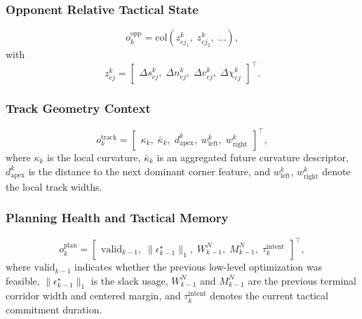\documentclass[final ,3p, times]{elsarticle}
\begin{document}
\subsubsection{Opponent Relative Tactical State}

\begin{equation}
o_k^{\mathrm{opp}}
=
\mathrm{col}
\left(
z_{ej_1}^k,\;
z_{ej_2}^k,\;
\dots
\right),
\label{eq:opponent_observation}
\end{equation}
with
\begin{equation}
z_{ej}^k=
\begin{bmatrix}
\Delta s_{ej}^k,\;
\Delta n_{ej}^k,\;
\Delta v_{ej}^k,\;
\Delta \chi_{ej}^k
\end{bmatrix}^{\!\top}.
\label{eq:relative_obs_repeat}
\end{equation}

\subsubsection{Track Geometry Context}

\begin{equation}
o_k^{\mathrm{track}}
=
\begin{bmatrix}
\kappa_k,\;
\bar\kappa_k,\;
d_{\mathrm{apex}}^k,\;
w_{\mathrm{left}}^k,\;
w_{\mathrm{right}}^k
\end{bmatrix}^{\!\top},
\label{eq:track_observation}
\end{equation}
where $\kappa_k$ is the local curvature, $\bar\kappa_k$ is an aggregated future curvature descriptor, $d_{\mathrm{apex}}^k$ is the distance to the next dominant corner feature, and $w_{\mathrm{left}}^k$, $w_{\mathrm{right}}^k$ denote the local track widths.

\subsubsection{Planning Health and Tactical Memory}

\begin{equation}
o_k^{\mathrm{plan}}
=
\begin{bmatrix}
\mathrm{valid}_{k-1},\;
\|\epsilon_{k-1}^\star\|_1,\;
W_{k-1}^{N},\;
M_{k-1}^{N},\;
\tau_k^{\mathrm{intent}}
\end{bmatrix}^{\!\top},
\label{eq:planner_observation}
\end{equation}
where $\mathrm{valid}_{k-1}$ indicates whether the previous low-level optimization was feasible, $\|\epsilon_{k-1}^\star\|_1$ is the slack usage, $W_{k-1}^{N}$ and $M_{k-1}^{N}$ are the previous terminal corridor width and centered margin, and $\tau_k^{\mathrm{intent}}$ denotes the current tactical commitment duration.
\end{document}
